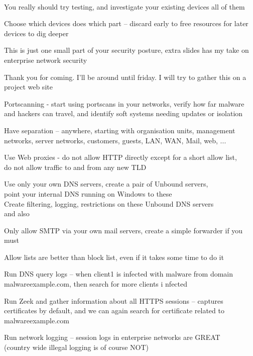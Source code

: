 \documentclass[Screen16to9,17pt]{foils}
\begin{document}
~
\begin{list2}
\item You really should try testing, and investigate your existing devices
all of them
\item Choose which devices does which part -- discard early to free resources for later devices to dig deeper
\item This is just one small part of your security posture, extra slides has my take on enterprise network security
\end{list2}

\myquestionspage


Thank you for coming. I'll be around until friday. I will try to gather this on a project web site 







\begin{list2}
\item Portscanning - start using portscans in your networks, verify how far malware and hackers can travel, and identify soft systems needing updates or isolation
\item Have separation -- anywhere, starting with organisation units, management networks, server networks, customers, guests, LAN, WAN, Mail, web, ...
\item Use Web proxies - do not allow HTTP directly except for a short allow list, \\
do not allow traffic to and from any new TLD
\item Use only your own DNS servers, create a pair of Unbound servers, \\
point your internal DNS running on Windows to these\\
Create filtering, logging, restrictions on these Unbound DNS servers\\
 and also 
\item Only allow SMTP via your own mail servers, create a simple forwarder if you must
\end{list2}

Allow lists are better than block list, even if it takes some time to do it



\begin{list2}
\item Run DNS query logs -- when client1 is infected with malware from domain malwareexample.com, then search for more clients i
nfected
\item Run Zeek and gather information about all HTTPS sessions -- captures certificates by default, and we can again search for
certificate related to malwareexample.com
\item Run network logging -- session logs in enterprise networks are GREAT \\
(country wide illegal logging is of course NOT)
\end{list2}
\end{document}
